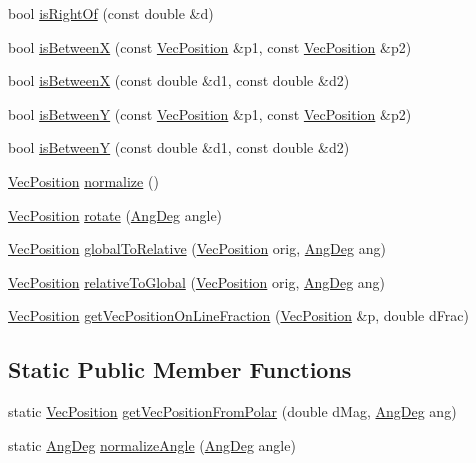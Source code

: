 \begin{DoxyCompactItemize}
\item 
bool \hyperlink{classVecPosition_aec6cb8550d1df213bc6d011333f6975a}{is\+Right\+Of} (const double \&d)
\item 
bool \hyperlink{classVecPosition_ae8028f25a2cfeacb1531bfb756e235da}{is\+BetweenX} (const \hyperlink{classVecPosition}{Vec\+Position} \&p1, const \hyperlink{classVecPosition}{Vec\+Position} \&p2)
\item 
bool \hyperlink{classVecPosition_aa6d32931a86cab8cacc45d0d869324eb}{is\+BetweenX} (const double \&d1, const double \&d2)
\item 
bool \hyperlink{classVecPosition_a0e7c3420be839195ca6c7176990846a5}{is\+BetweenY} (const \hyperlink{classVecPosition}{Vec\+Position} \&p1, const \hyperlink{classVecPosition}{Vec\+Position} \&p2)
\item 
bool \hyperlink{classVecPosition_a560db94e95eea58e163f428f2b33563b}{is\+BetweenY} (const double \&d1, const double \&d2)
\item 
\hyperlink{classVecPosition}{Vec\+Position} \hyperlink{classVecPosition_ad3667b1b224b1bb890905e5f5ab1b3cb}{normalize} ()
\item 
\hyperlink{classVecPosition}{Vec\+Position} \hyperlink{classVecPosition_af07fb781fded2e33a879cd99a4b01613}{rotate} (\hyperlink{Geometry_8h_a6bfe02ae9bb185092902092561ab2865}{Ang\+Deg} angle)
\item 
\hyperlink{classVecPosition}{Vec\+Position} \hyperlink{classVecPosition_abc456c42feb747af0fea7c680119c7d5}{global\+To\+Relative} (\hyperlink{classVecPosition}{Vec\+Position} orig, \hyperlink{Geometry_8h_a6bfe02ae9bb185092902092561ab2865}{Ang\+Deg} ang)
\item 
\hyperlink{classVecPosition}{Vec\+Position} \hyperlink{classVecPosition_a54aa8eee42e5a16f20743432b5945523}{relative\+To\+Global} (\hyperlink{classVecPosition}{Vec\+Position} orig, \hyperlink{Geometry_8h_a6bfe02ae9bb185092902092561ab2865}{Ang\+Deg} ang)
\item 
\hyperlink{classVecPosition}{Vec\+Position} \hyperlink{classVecPosition_a0361e7578b223b8e08741d0bf6ad0a80}{get\+Vec\+Position\+On\+Line\+Fraction} (\hyperlink{classVecPosition}{Vec\+Position} \&p, double d\+Frac)
\end{DoxyCompactItemize}
\subsection*{Static Public Member Functions}
\begin{DoxyCompactItemize}
\item 
static \hyperlink{classVecPosition}{Vec\+Position} \hyperlink{classVecPosition_abed1b1435c8bc9199cdd81d54ae07308}{get\+Vec\+Position\+From\+Polar} (double d\+Mag, \hyperlink{Geometry_8h_a6bfe02ae9bb185092902092561ab2865}{Ang\+Deg} ang)
\item 
static \hyperlink{Geometry_8h_a6bfe02ae9bb185092902092561ab2865}{Ang\+Deg} \hyperlink{classVecPosition_a52c43ea890deb4a495f02f3447eaafec}{normalize\+Angle} (\hyperlink{Geometry_8h_a6bfe02ae9bb185092902092561ab2865}{Ang\+Deg} angle)
\end{DoxyCompactItemize}
